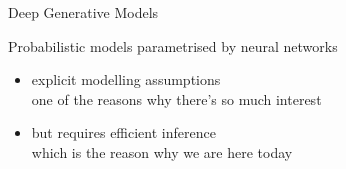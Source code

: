 \begin{frame}{Deep Generative Models}

Probabilistic models parametrised by neural networks
\begin{itemize}
	\pause
	\item explicit modelling assumptions\\
	one of the reasons why there's so much interest	
	\pause
	\item but requires efficient inference\\
	\pause
	\alert{which is the reason why we are here today}
\end{itemize}

\end{frame}